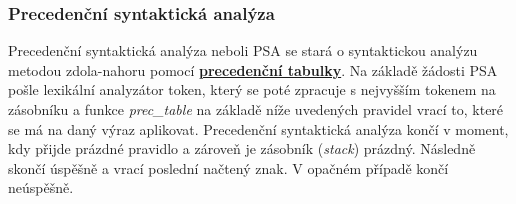 \documentclass[a4paper, 12pt]{article} %
\begin{document}
            \subsubsection{Precedenční syntaktická analýza}
                Precedenční syntaktická analýza neboli PSA se stará o syntaktickou analýzu metodou
                zdola-nahoru pomocí \hyperref[prectabulka]{\textbf{precedenční tabulky}}. Na základě
                žádosti PSA pošle lexikální analyzátor token, který se poté zpracuje s nejvyšším tokenem
                na zásobníku a funkce \textit{prec\_table} na základě níže uvedených pravidel vrací to,
                které se má na daný výraz aplikovat. Precedenční syntaktická analýza končí v moment, kdy 
                přijde prázdné pravidlo a zároveň je zásobník (\textit{stack}) prázdný. Následně skončí 
                úspěšně a vrací poslední načtený znak. V opačném případě končí neúspěšně.
\end{document}
